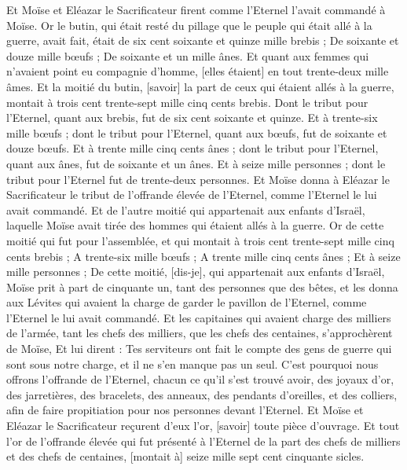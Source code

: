 \begin{multicols}{2}
Et Moïse et Eléazar le Sacrificateur firent comme l'Eternel l'avait commandé à Moïse.
Or le butin, qui était resté du pillage que le peuple qui était allé à la guerre, avait fait, était de six cent soixante et quinze mille brebis ;
De soixante et douze mille bœufs ;
De soixante et un mille ânes.
Et quant aux femmes qui n'avaient point eu compagnie d'homme, [elles étaient] en tout trente-deux mille âmes.
Et la moitié du butin, [savoir] la part de ceux qui étaient allés à la guerre, montait à trois cent trente-sept mille cinq cents brebis.
Dont le tribut pour l'Eternel, quant aux brebis, fut de six cent soixante et quinze.
Et à trente-six mille bœufs ; dont le tribut pour l'Eternel, quant aux bœufs, fut de soixante et douze bœufs.
Et à trente mille cinq cents ânes ; dont le tribut pour l'Eternel, quant aux ânes, fut de soixante et un ânes.
Et à seize mille personnes ; dont le tribut pour l'Eternel fut de trente-deux personnes.
Et Moïse donna à Eléazar le Sacrificateur le tribut de l'offrande élevée de l'Eternel, comme l'Eternel le lui avait commandé.
Et de l'autre moitié qui appartenait aux enfants d'Israël, laquelle Moïse avait tirée des hommes qui étaient allés à la guerre.
Or de cette moitié qui fut pour l'assemblée, et qui montait à trois cent trente-sept mille cinq cents brebis ;
A trente-six mille bœufs ;
A trente mille cinq cents ânes ;
Et à seize mille personnes ;
De cette moitié, [dis-je], qui appartenait aux enfants d'Israël, Moïse prit à part de cinquante un, tant des personnes que des bêtes, et les donna aux Lévites qui avaient la charge de garder le pavillon de l'Eternel, comme l'Eternel le lui avait commandé.
Et les capitaines qui avaient charge des milliers de l'armée, tant les chefs des milliers, que les chefs des centaines, s'approchèrent de Moïse,
Et lui dirent : Tes serviteurs ont fait le compte des gens de guerre qui sont sous notre charge, et il ne s'en manque pas un seul.
C'est pourquoi nous offrons l'offrande de l'Eternel, chacun ce qu'il s'est trouvé avoir, des joyaux d'or, des jarretières, des bracelets, des anneaux, des pendants d'oreilles, et des colliers, afin de faire propitiation pour nos personnes devant l'Eternel.
Et Moïse et Eléazar le Sacrificateur reçurent d'eux l'or, [savoir] toute pièce d'ouvrage.
Et tout l'or de l'offrande élevée qui fut présenté à l'Eternel de la part des chefs de milliers et des chefs de centaines, [montait à] seize mille sept cent cinquante sicles.

\end{multicols}
